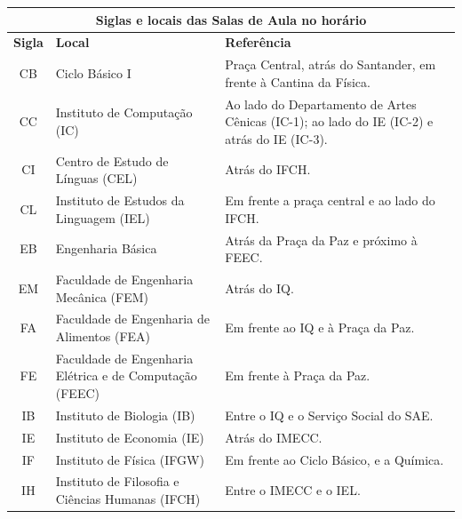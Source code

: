 \begin{table}[ht!]
    \centering
    \begin{tabular}{|c|p{}|p{}|}\hline
        \multicolumn{3}{|c|}{ \textbf{Siglas e locais das Salas de Aula no horário}}\\ \hline

        \textbf{Sigla}  &  \textbf{Local}  &  \textbf{Referência}\\ \hline

        CB  &  Ciclo Básico I  &  Praça Central, atrás do Santander, em frente à Cantina da Física.\\ \hline

        CC  &  Instituto de Computação (IC)  &  Ao lado do Departamento de Artes Cênicas (IC-1); ao lado do IE (IC-2) e atrás do IE (IC-3).\\ \hline

        CI  &  Centro de Estudo de Línguas (CEL)  &  Atrás do IFCH.\\ \hline

        CL  &  Instituto de Estudos da Linguagem (IEL)  &  Em frente a praça central e ao lado do IFCH.\\ \hline

        EB  &  Engenharia Básica  &  Atrás da Praça da Paz e próximo à FEEC.\\ \hline

        EM  &  Faculdade de Engenharia Mecânica (FEM)  &  Atrás do IQ.\\ \hline

        FA  &  Faculdade de Engenharia de Alimentos (FEA)  &  Em frente ao IQ e à Praça da Paz.\\ \hline

        FE  &  Faculdade de Engenharia Elétrica e de Computação (FEEC)  &  Em frente à Praça da Paz.\\ \hline

        IB  &  Instituto de Biologia (IB)  &  Entre o IQ e o Serviço Social do SAE.\\ \hline

        IE  &  Instituto de Economia (IE)  &  Atrás do IMECC.\\ \hline

        IF  &  Instituto de Física (IFGW)  &  Em frente ao Ciclo Básico, e a Química.\\ \hline

        IH  &  Instituto de Filosofia e Ciências Humanas (IFCH)  &  Entre o IMECC e o IEL.\\ \hline


\end{tabular}
\end{table}
